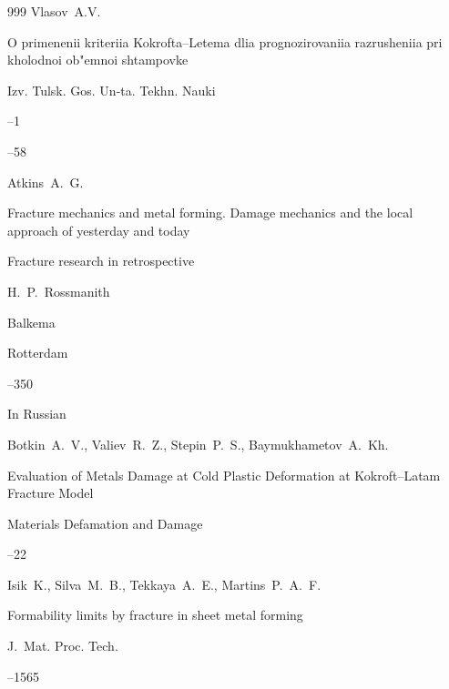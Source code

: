 \begin{thebibliography}{999}
\by Vlasov~A.V.

\paper O primenenii kriteriia Kokrofta--Letema dlia prognozirovaniia razrusheniia pri kholodnoi ob"emnoi shtampovke

\jour Izv. Tulsk. Gos. Un-ta. Tekhn. Nauki


--1

--58








\by  Atkins~A.~G.

\paper Fracture mechanics and metal forming. Damage mechanics and the local approach of yesterday and today

\inbook Fracture research in retrospective

\eds H.~P.~Rossmanith

\publ Balkema

\publaddr Rotterdam


–350





\lang In Russian

\by Botkin~A.~V., Valiev~R.~Z., Stepin~P.~S., Baymukhametov~A.~Kh.

\paper Evaluation of Metals Damage at Cold Plastic Deformation at Kokroft--Latam Fracture Model

\jour Materials Defamation and Damage



--22




\by Isik~K., Silva~M.~B., Tekkaya~A.~E., Martins~P.~A.~F. 

\paper Formability limits by fracture in sheet metal forming

\jour J.~Mat. Proc. Tech.  




--1565



\end{thebibliography}
